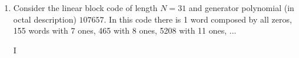 \documentclass[11pt]{article}
\begin{document}
\begin{enumerate}
\item 

Consider the linear block code of length $N = 31$ and generator polynomial (in octal description)
$107657$. In this code there is 1 word composed by all zeros, 155 words with 7 ones, 465 with 8 ones, 5208 with 11 ones, ...




I%







\end{enumerate}
\end{document}
